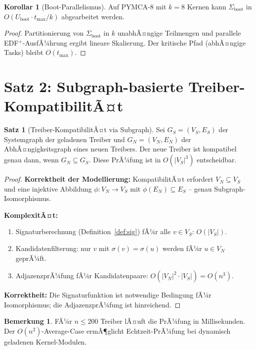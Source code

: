 ﻿\documentclass[a4paper,12pt]{scrreprt}
\theoremstyle{definition}
\newtheorem{satz}{Satz}[chapter]
\newtheorem{korollar}{Korollar}[chapter]
\newtheorem{bemerkung}{Bemerkung}[chapter]
\begin{document}
	\begin{korollar}[Boot-Parallelismus]\label{kor:boot_par}
		Auf PYMCA-8 mit $k = 8$ Kernen kann $\Sigma_{\mathrm{boot}}$ in
		$O(U_{\mathrm{boot}} \cdot t_{\max} / k)$ abgearbeitet werden.
	\end{korollar}
	
	\begin{proof}
		Partitionierung von $\Sigma_{\mathrm{boot}}$ in $k$ unabhÃ¤ngige
		Teilmengen und parallele EDF$^+$-AusfÃ¼hrung ergibt lineare Skalierung.
		Der kritische Pfad (abhÃ¤ngige Tasks) bleibt $O(t_{\max})$.
	\end{proof}
	
	\section{Satz 2: Subgraph-basierte Treiber-KompatibilitÃ¤t}
	
	\begin{satz}[Treiber-KompatibilitÃ¤t via Subgraph]\label{satz:drv_compat}
		Sei $G_S = (V_S, E_S)$ der Systemgraph der geladenen Treiber und
		$G_N = (V_N, E_N)$ der AbhÃ¤ngigkeitsgraph eines neuen Treibers.
		Der neue Treiber ist kompatibel genau dann, wenn $G_N \subseteq G_S$.
		Diese PrÃ¼fung ist in $O(|V_S|^3)$ entscheidbar.
	\end{satz}
	
	\begin{proof}
		\textbf{Korrektheit der Modellierung:} KompatibilitÃ¤t erfordert
		$V_N \subseteq V_S$ und eine injektive Abbildung
		$\phi: V_N \to V_S$ mit $\phi(E_N) \subseteq E_S$ --
		genau Subgraph-Isomorphismus.
		
		\textbf{KomplexitÃ¤t:}
		\begin{enumerate}
			\item Signaturberechnung (Definition~\ref{def:sig}) fÃ¼r alle $v \in V_S$: $O(|V_S|)$.
			\item Kandidatenfilterung: nur $v$ mit $\sigma(v) = \sigma(u)$
			werden fÃ¼r $u \in V_N$ geprÃ¼ft.
			\item AdjazenzprÃ¼fung fÃ¼r Kandidatenpaare: $O(|V_N|^2 \cdot |V_S|) = O(n^3)$.
		\end{enumerate}
		
		\textbf{Korrektheit:} Die Signaturfunktion ist notwendige Bedingung
		fÃ¼r Isomorphismus; die AdjazenzprÃ¼fung ist hinreichend.
	\end{proof}
	
	\begin{bemerkung}
		FÃ¼r $n \leq 200$ Treiber lÃ¤uft die PrÃ¼fung in Millisekunden.
		Der $O(n^2)$-Average-Case ermÃ¶glicht Echtzeit-PrÃ¼fung bei
		dynamisch geladenen Kernel-Modulen.
	\end{bemerkung}
	
\end{document}
